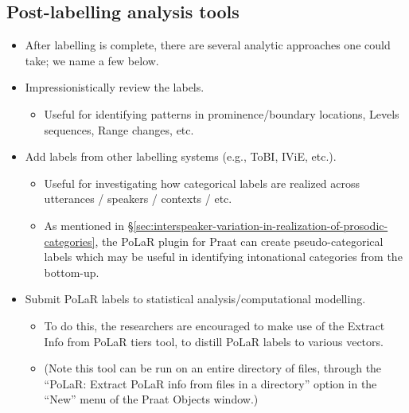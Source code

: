 \subsection{Post-labelling analysis tools}
	\begin{itemize}
		\item After labelling is complete, there are several analytic approaches one could take; we name a few below.
		\item Impressionistically review the labels.
		\begin{itemize}
			\item Useful for identifying patterns in prominence\slash boundary locations, Levels sequences, Range changes, etc.
		\end{itemize}
		\item Add labels from other labelling systems (e.g., ToBI, IViE, etc.).
		\begin{itemize}
			\item Useful for investigating how categorical labels are realized across utterances / speakers / contexts / etc.
			\item As mentioned in §\ref{sec:interspeaker-variation-in-realization-of-prosodic-categories}, the PoLaR plugin for Praat can create pseudo-categorical labels which may be useful in identifying intonational categories from the bottom-up.
		\end{itemize}
		\item Submit PoLaR labels to statistical analysis\slash computational modelling.
		\begin{itemize}
			\item To do this, the researchers are encouraged to make use of the Extract Info from PoLaR tiers tool, to distill PoLaR labels to various vectors.
			\item (Note this tool can be run on an entire directory of files, through the “PoLaR: Extract PoLaR info from files in a directory” option in the “New” menu of the Praat Objects window.)
		\end{itemize}
	\end{itemize}

